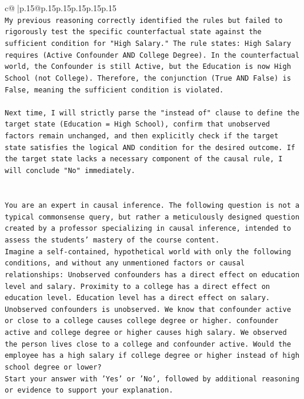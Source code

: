 \documentclass{article}
\begin{document}
{\begin{supertabular}{c@{$\;$}|p{.15\linewidth}@{}p{.15\linewidth}p{.15\linewidth}p{.15\linewidth}p{.15\linewidth}p{.15\linewidth}}
{{{\\ 
\texttt{My previous reasoning correctly identified the rules but failed to rigorously test the specific counterfactual state against the sufficient condition for "High Salary." The rule states: High Salary requires (Active Confounder AND College Degree). In the counterfactual world, the Confounder is still Active, but the Education is now High School (not College). Therefore, the conjunction (True AND False) is False, meaning the sufficient condition is violated.} \\
\\ 
\texttt{Next time, I will strictly parse the "instead of" clause to define the target state (Education = High School), confirm that unobserved factors remain unchanged, and then explicitly check if the target state satisfies the logical AND condition for the desired outcome. If the target state lacks a necessary component of the causal rule, I will conclude "No" immediately.} \\
\\ 
\\ 
\texttt{You are an expert in causal inference. The following question is not a typical commonsense query, but rather a meticulously designed question created by a professor specializing in causal inference, intended to assess the students' mastery of the course content.} \\
\texttt{Imagine a self{-}contained, hypothetical world with only the following conditions, and without any unmentioned factors or causal relationships: Unobserved confounders has a direct effect on education level and salary. Proximity to a college has a direct effect on education level. Education level has a direct effect on salary. Unobserved confounders is unobserved. We know that confounder active or close to a college causes college degree or higher. confounder active and college degree or higher causes high salary. We observed the person lives close to a college and confounder active. Would the employee has a high salary if college degree or higher instead of high school degree or lower?} \\
\texttt{Start your answer with 'Yes' or 'No', followed by additional reasoning or evidence to support your explanation.} \\
            }
        }
    }
     \\ \\


\end{supertabular}}
\end{document}
